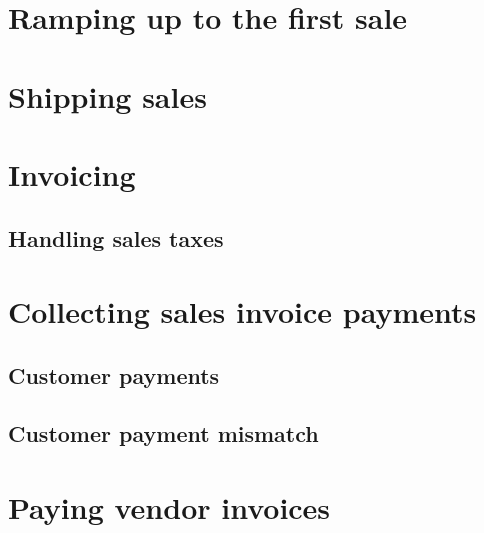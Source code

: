 \chapter{Ramping up to the first sale}
\label{cha-ramping-up-to-the-first-sale}


\chapter{Shipping sales}
\label{cha-shipping-sales}

\chapter{Invoicing}
\label{cha-starting-invoicing}

\section{Handling sales taxes}
\label{sec-invoicing-sales-tax}


% 


\chapter{Collecting sales invoice payments}
\label{cha-starting-sales-customer-payments}

\section{Customer payments}
\label{sec-starting-sales-customer-payments}

\section{Customer payment mismatch}
\label{sec-starting-sales-payment-mismatch}





\chapter{Paying vendor invoices}
\label{cha-starting-vendor-payments}

